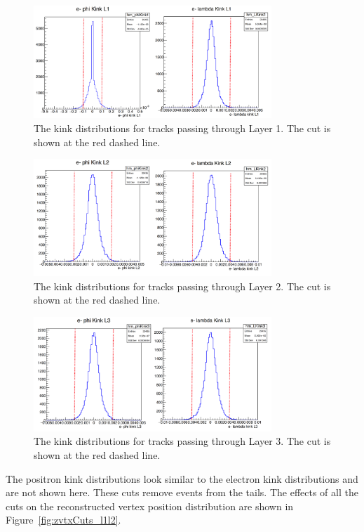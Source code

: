 \begin{figure}[H]
  \centering
      \includegraphics[width=0.8\textwidth]{pics/appendix/kink1.png}
  \caption{The kink distributions for tracks passing through Layer 1. The cut is shown at the red dashed line.}
  \label{fig:kink1}
\end{figure} 
\begin{figure}[H]
  \centering
      \includegraphics[width=0.8\textwidth]{pics/appendix/kink2.png}
  \caption{The kink distributions for tracks passing through Layer 2. The cut is shown at the red dashed line.}
  \label{fig:kink2}
\end{figure} 
\begin{figure}[H]
  \centering
      \includegraphics[width=0.8\textwidth]{pics/appendix/kink3.png}
  \caption{The kink distributions for tracks passing through Layer 3. The cut is shown at the red dashed line.}
  \label{fig:kink3}
\end{figure} 

The positron kink distributions look similar to the electron kink distributions and are not shown here. These cuts remove events from the tails. The effects of all the cuts on the reconstructed vertex position distribution are shown in Figure~\ref{fig:zvtxCuts_l1l2}.


